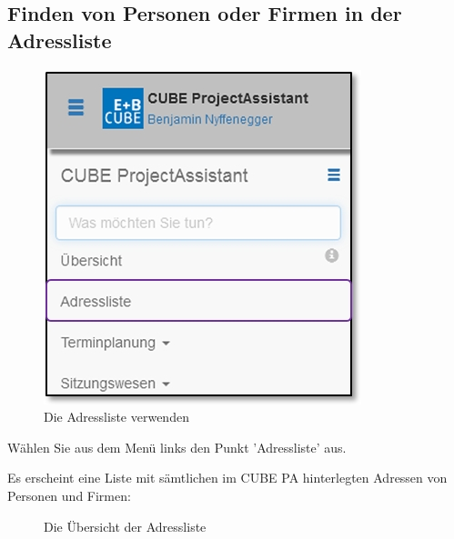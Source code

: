 \subsection{Finden von Personen oder Firmen in der Adressliste}

\begin{figure}   %
  \vspace{-35pt}      %
  \begin{center}
    \includegraphics[width=1\linewidth]{../chapters/03_Adressliste/pictures/3-1_Menu_Adressliste.jpg}
  \end{center}
  \vspace{-20pt}
  \caption{Die Adressliste verwenden}
  \vspace{-10pt}
\end{figure}

Wählen Sie aus dem Menü links den Punkt 'Adressliste' aus.

\vspace{7cm}

Es erscheint eine Liste mit sämtlichen im CUBE PA hinterlegten Adressen von Personen und Firmen:

\begin{figure}[H]
\caption{Die Übersicht der Adressliste}
\end{figure}

